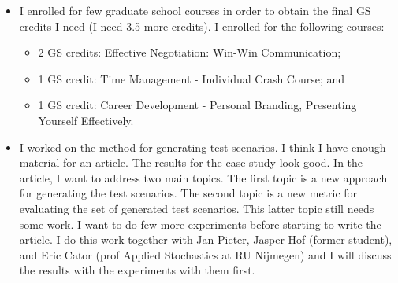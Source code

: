 \documentclass[10pt,final,a4paper,oneside,onecolumn]{article}
\begin{document}
\begin{itemize}
	\item I enrolled for few graduate school courses in order to obtain the final GS credits I need (I need 3.5 more credits). I enrolled for the following courses:
	\begin{itemize}
		\item 2 GS credits: Effective Negotiation: Win-Win Communication;
		\item 1 GS credit: Time Management - Individual Crash Course; and
		\item 1 GS credit: Career Development - Personal Branding, Presenting Yourself Effectively.
	\end{itemize}
	
	\item I worked on the method for generating test scenarios.
	 I think I have enough material for an article. 
	 The results for the case study look good. 
	 In the article, I want to address two main topics. 
	 The first topic is a new approach for generating the test scenarios. 
	 The second topic is a new metric for evaluating the set of generated test scenarios. 
	 This latter topic still needs some work. 
	 I want to do few more experiments before starting to write the article.
	 I do this work together with Jan-Pieter, Jasper Hof (former student), and Eric Cator (prof  Applied Stochastics at RU Nijmegen) and I will discuss the results with the experiments with them first.
	 

\end{itemize}
\end{document}
